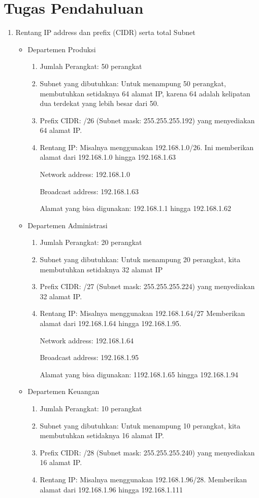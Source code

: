 \section{Tugas Pendahuluan}
\begin{enumerate}
	\item Rentang IP address dan prefix (CIDR) serta total Subnet
	\begin{itemize}
		\item Departemen Produksi
		\begin{enumerate}
		\item Jumlah Perangkat: 50 perangkat
		\item Subnet yang dibutuhkan: Untuk menampung 50 perangkat, membutuhkan setidaknya 64 alamat IP, karena 64 adalah kelipatan dua terdekat yang lebih besar dari 50.
		\item Prefix CIDR: /26 (Subnet mask: 255.255.255.192) yang menyediakan 64 alamat IP.
		\item Rentang IP: Misalnya menggunakan 192.168.1.0/26. Ini memberikan alamat dari 192.168.1.0 hingga 192.168.1.63

		Network address: 192.168.1.0
	
		Broadcast address: 192.168.1.63
		
		Alamat yang bisa digunakan: 192.168.1.1 hingga 192.168.1.62
	\end{enumerate}
		\item Departemen Administrasi
		\begin{enumerate}
		\item Jumlah Perangkat: 20 perangkat
		\item Subnet yang dibutuhkan: Untuk menampung 20 perangkat, kita membutuhkan setidaknya 32 alamat IP
		\item Prefix CIDR: /27 (Subnet mask: 255.255.255.224) yang menyediakan 32 alamat IP.
		\item Rentang IP: Misalnya menggunakan 192.168.1.64/27
		Memberikan alamat dari 192.168.1.64 hingga 192.168.1.95.

		Network address: 192.168.1.64
	
		Broadcast address: 192.168.1.95
		
		Alamat yang bisa digunakan: 1192.168.1.65 hingga 192.168.1.94
	\end{enumerate}
	\item Departemen Keuangan
		\begin{enumerate}
		\item Jumlah Perangkat: 10 perangkat
		\item Subnet yang dibutuhkan: Untuk menampung 10 perangkat, kita membutuhkan setidaknya 16 alamat IP.
		\item Prefix CIDR: /28 (Subnet mask: 255.255.255.240) yang menyediakan 16 alamat IP.
		\item Rentang IP: Misalnya menggunakan 192.168.1.96/28. Memberikan alamat dari 192.168.1.96 hingga 192.168.1.111


\end{enumerate}
\end{itemize}
\end{enumerate}
